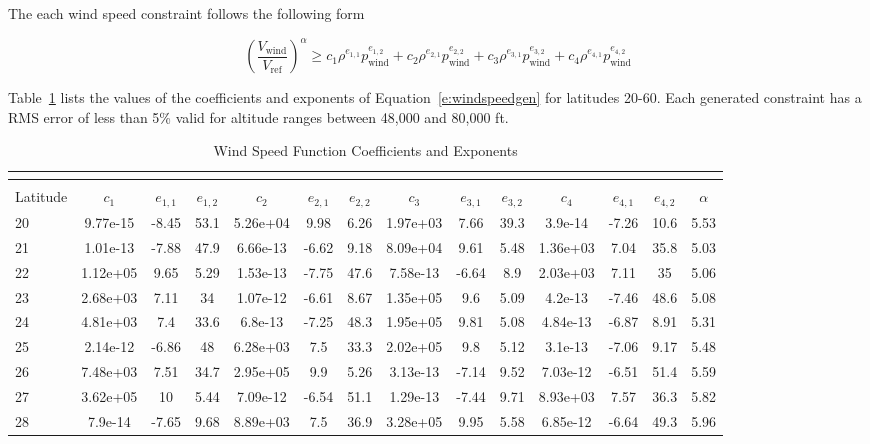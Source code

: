 \documentclass[]{aiaa-tc}%
\begin{document}
The each wind speed constraint follows the following form

\begin{equation}
    \label{e:windspeedgen}
    \left(\frac{V_{\text{wind}}}{V_{\text{ref}}}\right)^{\alpha} \geq c_1 \rho^{e_{1,1}}p_{\text{wind}}^{e_{1,2}} + c_2 \rho^{e_{2,1}}p_{\text{wind}}^{e_{2,2}} + c_3 \rho^{e_{3,1}}p_{\text{wind}}^{e_{3,2}} + c_4 \rho^{e_{4,1}}p_{\text{wind}}^{e_{4,2}}
\end{equation}

Table~\ref{t:windvals} lists the values of the coefficients and exponents of Equation~\eqref{e:windspeedgen} for latitudes 20-60. Each generated constraint has a RMS error of less than 5\% valid for altitude ranges between 48,000 and 80,000 ft. 

\tiny
\begin{longtable}{lccccccccccccc} \\
\label{t:windvals} \\
    \toprule
    \toprule
    \caption{Wind Speed Function Coefficients and Exponents} \\
    Latitude & $c_1$ & $e_{1,1}$ & $e_{1,2}$ & $c_2$ & $e_{2,1}$ & $e_{2,2}$ & $c_3$ & $e_{3,1}$ & $e_{3,2}$ & $c_4$ & $e_{4,1}$ & $e_{4,2}$ & $\alpha$ \\
    \midrule
20 & 9.77e-15 & -8.45 & 53.1 & 5.26e+04 & 9.98 & 6.26 & 1.97e+03 & 7.66 & 39.3 & 3.9e-14 & -7.26 & 10.6 & 5.53\\
21 & 1.01e-13 & -7.88 & 47.9 & 6.66e-13 & -6.62 & 9.18 & 8.09e+04 & 9.61 & 5.48 & 1.36e+03 & 7.04 & 35.8 & 5.03\\
22 & 1.12e+05 & 9.65 & 5.29 & 1.53e-13 & -7.75 & 47.6 & 7.58e-13 & -6.64 & 8.9 & 2.03e+03 & 7.11 & 35 & 5.06\\
23 & 2.68e+03 & 7.11 & 34 & 1.07e-12 & -6.61 & 8.67 & 1.35e+05 & 9.6 & 5.09 & 4.2e-13 & -7.46 & 48.6 & 5.08\\
24 & 4.81e+03 & 7.4 & 33.6 & 6.8e-13 & -7.25 & 48.3 & 1.95e+05 & 9.81 & 5.08 & 4.84e-13 & -6.87 & 8.91 & 5.31\\
25 & 2.14e-12 & -6.86 & 48 & 6.28e+03 & 7.5 & 33.3 & 2.02e+05 & 9.8 & 5.12 & 3.1e-13 & -7.06 & 9.17 & 5.48\\
26 & 7.48e+03 & 7.51 & 34.7 & 2.95e+05 & 9.9 & 5.26 & 3.13e-13 & -7.14 & 9.52 & 7.03e-12 & -6.51 & 51.4 & 5.59\\
27 & 3.62e+05 & 10 & 5.44 & 7.09e-12 & -6.54 & 51.1 & 1.29e-13 & -7.44 & 9.71 & 8.93e+03 & 7.57 & 36.3 & 5.82\\
28 & 7.9e-14 & -7.65 & 9.68 & 8.89e+03 & 7.5 & 36.9 & 3.28e+05 & 9.95 & 5.58 & 6.85e-12 & -6.64 & 49.3 & 5.96\\

\end{longtable}
\end{document}
